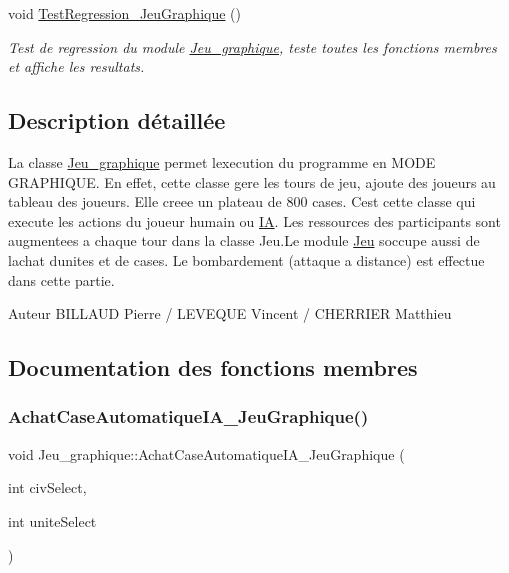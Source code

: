 \begin{DoxyCompactItemize}
void \hyperlink{classJeu__graphique_abc9707aea80c14dee891b4249c602c9c}{Test\+Regression\+\_\+\+Jeu\+Graphique} ()
\begin{DoxyCompactList}\small\item\em Test de regression du module \hyperlink{classJeu__graphique}{Jeu\+\_\+graphique}, teste toutes les fonctions membres et affiche les resultats. \end{DoxyCompactList}\end{DoxyCompactItemize}


\subsection{Description détaillée}
La classe \hyperlink{classJeu__graphique}{Jeu\+\_\+graphique} permet l\textquotesingle{}execution du programme en M\+O\+DE G\+R\+A\+P\+H\+I\+Q\+UE. En effet, cette classe gere les tours de jeu, ajoute des joueurs au tableau des joueurs. Elle creee un plateau de 800 cases. C\textquotesingle{}est cette classe qui execute les actions du joueur humain ou \hyperlink{classIA}{IA}. Les ressources des participants sont augmentees a chaque tour dans la classe Jeu.\+Le module \hyperlink{classJeu}{Jeu} s\textquotesingle{}occupe aussi de l\textquotesingle{}achat d\textquotesingle{}unites et de cases. Le bombardement (attaque a distance) est effectue dans cette partie. 

\begin{DoxyAuthor}{Auteur}
B\+I\+L\+L\+A\+UD Pierre / L\+E\+V\+E\+Q\+UE Vincent / C\+H\+E\+R\+R\+I\+ER Matthieu 
\end{DoxyAuthor}


\subsection{Documentation des fonctions membres}
\mbox{\label{classJeu__graphique_a3e52d90cbfecc5574d57cf9edd2e6dbe}} 
\subsubsection{\texorpdfstring{Achat\+Case\+Automatique\+I\+A\+\_\+\+Jeu\+Graphique()}{AchatCaseAutomatiqueIA\_JeuGraphique()}}
{\footnotesize\ttfamily void Jeu\+\_\+graphique\+::\+Achat\+Case\+Automatique\+I\+A\+\_\+\+Jeu\+Graphique (\begin{DoxyParamCaption}\item[{int}]{civ\+Select,  }\item[{int}]{unite\+Select }\end{DoxyParamCaption})}



